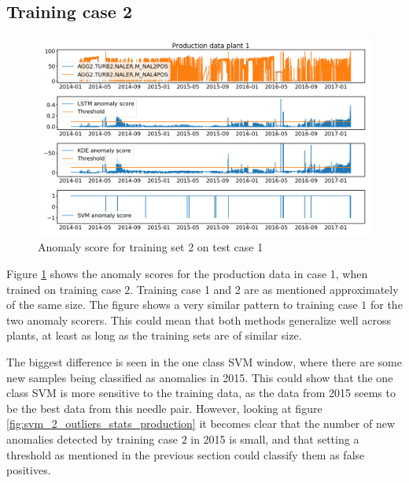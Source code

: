     \subsection{Training case 2}
        \begin{figure}[h!]
            \centering
            \includegraphics[width=\textwidth]{report/figures/analysis/plant2_train_short/production_data_anomaly.png}
            \caption{Anomaly score for training set 2 on test case 1}
            \label{fig:plant2_short_prod_anomaly_score}
        \end{figure}
        Figure \ref{fig:plant2_short_prod_anomaly_score} shows the anomaly scores for the production data in case 1, when trained on training case $2$. Training case 1 and 2 are as mentioned approximately of the same size. The figure shows a very similar pattern to training case $1$ for the two anomaly scorers. This could mean that both methods generalize well across plants, at least as long as the training sets are of similar size. 
        
        The biggest difference is seen in the one class SVM window, where there are some new samples being classified as anomalies in 2015. This could show that the one class SVM is more sensitive to the training data, as the data from 2015 seems to be the best data from this needle pair. However, looking at figure \ref{fig:svm_2_outliers_stats_production} it becomes clear that the number of new anomalies detected by training case $2$ in 2015 is small, and that setting a threshold as mentioned in the previous section could classify them as false positives.  
        
